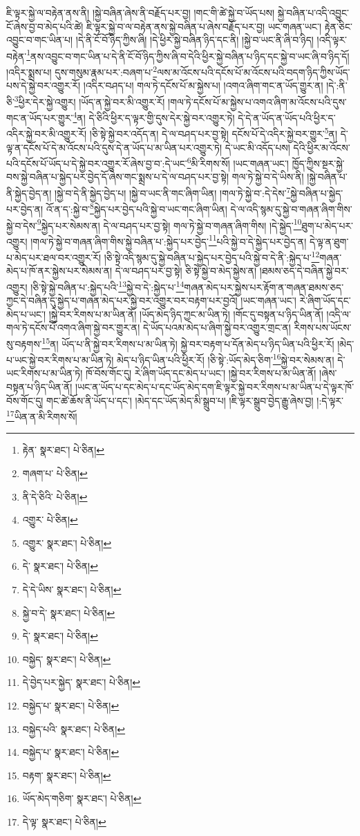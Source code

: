 ཇི་ལྟར་སྐྱེ་ལ་བརྟེན་ནས་ནི། །སྐྱེ་བཞིན་ཞེས་ནི་བརྗོད་པར་བྱ། །གང་གི་ཚེ་སྐྱེ་བ་ཡོད་པས། སྐྱེ་བཞིན་པ་འདི་འབྱུང་ངོ་ཞེས་བྱ་བ་མེད་པའི་ཚེ། ཇི་ལྟར་སྐྱེ་བ་ལ་བརྟེན་ནས་སྐྱེ་བཞིན་པ་ཞེས་བརྗོད་པར་བྱ། ཡང་གཞན་ཡང་། རྟེན་ཅིང་འབྱུང་བ་གང་ཡིན་པ། །དེ་ནི་ངོ་བོ་ཉིད་ཀྱིས་ཞི། །དེ་ཕྱིར་སྐྱེ་བཞིན་ཉིད་དང་ནི། །སྐྱེ་བ་ཡང་ནི་ཞི་བ་ཉིད། །འདི་ལྟར་བརྟེན་\footnote{རྟེན་  སྣར་ཐང་།  པེ་ཅིན། }ནས་འབྱུང་བ་གང་ཡིན་པ་དེ་ནི་ངོ་བོ་ཉིད་ཀྱིས་ཞི་བ་དེའི་ཕྱིར་སྐྱེ་བཞིན་པ་ཉིད་དང་སྐྱེ་བ་ཡང་ཞི་བ་ཉིད་དོ། །འདིར་སྨྲས་པ། དུས་གསུམ་རྣམ་པར་:བཞག་པ་\footnote{གཞག་པ་  པེ་ཅིན། }ལས་མ་འོངས་པའི་དངོས་པོ་མ་འོངས་པའི་བདག་ཉིད་ཀྱིས་ཡོད་པས་དེ་སྐྱེ་བར་འགྱུར་རོ། །འདིར་བཤད་པ། གལ་ཏེ་དངོས་པོ་མ་སྐྱེས་པ། །འགའ་ཞིག་གང་ན་ཡོད་གྱུར་ན། །དེ་:ནི་ཅི་\footnote{ནི་དེ་ཅིའི་  པེ་ཅིན། }ཕྱིར་དེར་སྐྱེ་འགྱུར། །ཡོད་ན་སྐྱེ་བར་མི་འགྱུར་རོ། །གལ་ཏེ་དངོས་པོ་མ་སྐྱེས་པ་འགའ་ཞིག་མ་འོངས་པའི་དུས་གང་ན་ཡོད་པར་གྱུར་\footnote{འགྱུར་  པེ་ཅིན། }ན། དེ་ཅིའི་ཕྱིར་ད་ལྟར་གྱི་དུས་དེར་སྐྱེ་བར་འགྱུར་ཏེ། དེ་དེ་ན་ཡོད་ན་ཡོད་པའི་ཕྱིར་ད་འདིར་སྐྱེ་བར་མི་འགྱུར་རོ། །ཅི་སྟེ་སྐྱེ་བར་འདོད་ན། དེ་ལ་བཤད་པར་བྱ་སྟེ། དངོས་པོ་དེ་འདིར་སྐྱེ་བར་གྱུར་\footnote{འགྱུར་  སྣར་ཐང་།  པེ་ཅིན། }ན། དེ་ལྟ་ན་དངོས་པོ་དེ་མ་འོངས་པའི་དུས་དེ་ན་ཡོད་པ་མ་ཡིན་པར་འགྱུར་ཏེ། དེ་ཡང་མི་འདོད་པས། དེའི་ཕྱིར་མ་འོངས་པའི་དངོས་པོ་ཡོད་པ་དེ་སྐྱེ་བར་འགྱུར་རོ་ཞེས་བྱ་བ་:དེ་ཡང་\footnote{དེ་  སྣར་ཐང་།  པེ་ཅིན། }མི་རིགས་སོ། །ཡང་གཞན་ཡང་། ཁྱོད་ཀྱིས་སྔར་སྐྱེ་བས་སྐྱེ་བཞིན་པ་སྐྱེད་པར་བྱེད་དོ་ཞེས་གང་སྨྲས་པ་དེ་ལ་བཤད་པར་བྱ་སྟེ། གལ་ཏེ་སྐྱེ་བ་དེ་ཡིས་ནི། །སྐྱེ་བཞིན་པ་ནི་སྐྱེད་བྱེད་ན། །སྐྱེ་བ་དེ་ནི་སྐྱེད་བྱེད་པ། །སྐྱེ་བ་ཡང་ནི་གང་ཞིག་ཡིན། །གལ་ཏེ་སྐྱེ་བ་:དེ་དེས་\footnote{དེ་དེ་ཡིས་  སྣར་ཐང་།  པེ་ཅིན། }སྐྱེ་བཞིན་པ་སྐྱེད་པར་བྱེད་ན། འོ་ན་ད་:སྐྱེ་བ་\footnote{སྐྱེ་བ་དེ་  སྣར་ཐང་།  པེ་ཅིན། }སྐྱེད་པར་བྱེད་པའི་སྐྱེ་བ་ཡང་གང་ཞིག་ཡིན། དེ་ལ་འདི་སྙམ་དུ་སྐྱེ་བ་གཞན་ཞིག་གིས་སྐྱེ་བ་དེས་\footnote{དེ་  སྣར་ཐང་།  པེ་ཅིན། }སྐྱེད་པར་སེམས་ན། དེ་ལ་བཤད་པར་བྱ་སྟེ། གལ་ཏེ་སྐྱེ་བ་གཞན་ཞིག་གིས། །དེ་སྐྱེད་\footnote{བསྐྱེད་  སྣར་ཐང་།  པེ་ཅིན། }ཐུག་པ་མེད་པར་འགྱུར། །གལ་ཏེ་སྐྱེ་བ་གཞན་ཞིག་གིས་སྐྱེ་བཞིན་པ་:སྐྱེད་པར་བྱེད་\footnote{དེ་བྱེད་པར་སྐྱེད་  སྣར་ཐང་།  པེ་ཅིན། }པའི་སྐྱེ་བ་དེ་སྐྱེད་པར་བྱེད་ན། དེ་ལྟ་ན་ཐུག་པ་མེད་པར་ཐལ་བར་འགྱུར་རོ། །ཅི་སྟེ་འདི་སྙམ་དུ་སྐྱེ་བཞིན་པ་སྐྱེད་པར་བྱེད་པའི་སྐྱེ་བ་དེ་ནི་:སྐྱེད་པ་\footnote{བསྐྱེད་པ་  སྣར་ཐང་།  པེ་ཅིན། }གཞན་མེད་པ་ཁོ་ནར་སྐྱེས་པར་སེམས་ན། དེ་ལ་བཤད་པར་བྱ་སྟེ། ཅི་སྟེ་སྐྱེ་བ་མེད་སྐྱེས་ན། །ཐམས་ཅད་དེ་བཞིན་སྐྱེ་བར་འགྱུར། །ཅི་སྟེ་སྐྱེ་བཞིན་པ་:སྐྱེད་པའི་\footnote{བསྐྱེད་པའི་  སྣར་ཐང་།  པེ་ཅིན། }སྐྱེ་བ་དེ་:སྐྱེད་པ་\footnote{བསྐྱེད་པ་  སྣར་ཐང་།  པེ་ཅིན། }གཞན་མེད་པར་སྐྱེས་པར་རྟོག་ན་གཞན་ཐམས་ཅད་ཀྱང་དེ་བཞིན་དུ་སྐྱེད་པ་གཞན་མེད་པར་སྐྱེ་བར་འགྱུར་བར་བརྟག་པར་བྱའོ། །ཡང་གཞན་ཡང་། རེ་ཞིག་ཡོད་དང་མེད་པ་ཡང་། །སྐྱེ་བར་རིགས་པ་མ་ཡིན་ནོ། །ཡོད་མེད་ཉིད་ཀྱང་མ་ཡིན་ཏེ། །གོང་དུ་བསྟན་པ་ཉིད་ཡིན་ནོ། །འདི་ལ་གལ་ཏེ་དངོས་པོ་འགའ་ཞིག་སྐྱེ་བར་གྱུར་ན། དེ་ཡོད་པའམ་མེད་པ་ཞིག་སྐྱེ་བར་འགྱུར་གྲང་ན། རིགས་པས་ཡོངས་སུ་བརྟགས་\footnote{བརྟག་  སྣར་ཐང་།  པེ་ཅིན། }ན། ཡོད་པ་ནི་སྐྱེ་བར་རིགས་པ་མ་ཡིན་ཏེ། སྐྱེ་བར་བརྟག་པ་དོན་མེད་པ་ཉིད་ཡིན་པའི་ཕྱིར་རོ། །མེད་པ་ཡང་སྐྱེ་བར་རིགས་པ་མ་ཡིན་ཏེ། མེད་པ་ཉིད་ཡིན་པའི་ཕྱིར་རོ། །ཅི་སྟེ་:ཡོད་མེད་ཅིག་\footnote{ཡོད་མེད་གཅིག་  སྣར་ཐང་།  པེ་ཅིན། }སྐྱེ་བར་སེམས་ན། དེ་ཡང་རིགས་པ་མ་ཡིན་ཏེ། ཁོ་བོས་གོང་དུ། རེ་ཞིག་ཡོད་དང་མེད་པ་ཡང་། །སྐྱེ་བར་རིགས་པ་མ་ཡིན་ནོ། །ཞེས་བསྟན་པ་ཉིད་ཡིན་ནོ། །ཡང་ན་ཡོད་པ་དང་མེད་པ་དང་ཡོད་མེད་དག་ཇི་ལྟར་སྐྱེ་བར་རིགས་པ་མ་ཡིན་པ་དེ་ལྟར་ཁོ་བོས་གོང་དུ། གང་ཚེ་ཆོས་ནི་ཡོད་པ་དང་། །མེད་དང་ཡོད་མེད་མི་སྒྲུབ་པ། །ཇི་ལྟར་སྒྲུབ་བྱེད་རྒྱུ་ཞེས་བྱ། །:དེ་ལྟར་\footnote{དེ་ལྟ་  སྣར་ཐང་།  པེ་ཅིན། }ཡིན་ན་མི་རིགས་སོ། 